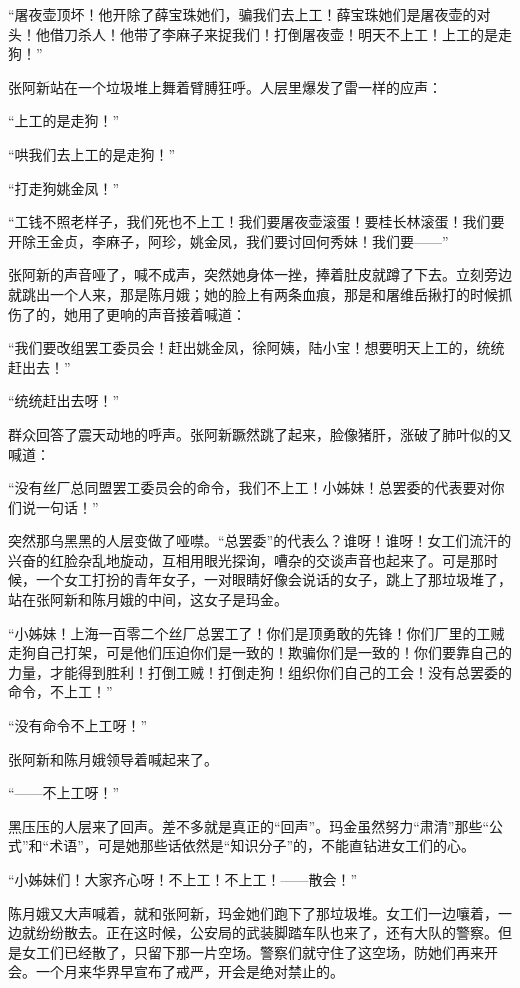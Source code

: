 \par “屠夜壶顶坏！他开除了薛宝珠她们，骗我们去上工！薛宝珠她们是屠夜壶的对头！他借刀杀人！他带了李麻子来捉我们！打倒屠夜壶！明天不上工！上工的是走狗！”
\par 张阿新站在一个垃圾堆上舞着臂膊狂呼。人层里爆发了雷一样的应声：
\par “上工的是走狗！”
\par “哄我们去上工的是走狗！”
\par “打走狗姚金凤！”
\par “工钱不照老样子，我们死也不上工！我们要屠夜壶滚蛋！要桂长林滚蛋！我们要开除王金贞，李麻子，阿珍，姚金凤，我们要讨回何秀妹！我们要——”
\par 张阿新的声音哑了，喊不成声，突然她身体一挫，捧着肚皮就蹲了下去。立刻旁边就跳出一个人来，那是陈月娥；她的脸上有两条血痕，那是和屠维岳揪打的时候抓伤了的，她用了更响的声音接着喊道：
\par “我们要改组罢工委员会！赶出姚金凤，徐阿姨，陆小宝！想要明天上工的，统统赶出去！”
\par “统统赶出去呀！”
\par 群众回答了震天动地的呼声。张阿新蹶然跳了起来，脸像猪肝，涨破了肺叶似的又喊道：
\par “没有丝厂总同盟罢工委员会的命令，我们不上工！小姊妹！总罢委的代表要对你们说一句话！”
\par 突然那乌黑黑的人层变做了哑噤。“总罢委”的代表么？谁呀！谁呀！女工们流汗的兴奋的红脸杂乱地旋动，互相用眼光探询，嘈杂的交谈声音也起来了。可是那时候，一个女工打扮的青年女子，一对眼睛好像会说话的女子，跳上了那垃圾堆了，站在张阿新和陈月娥的中间，这女子是玛金。
\par “小姊妹！上海一百零二个丝厂总罢工了！你们是顶勇敢的先锋！你们厂里的工贼走狗自己打架，可是他们压迫你们是一致的！欺骗你们是一致的！你们要靠自己的力量，才能得到胜利！打倒工贼！打倒走狗！组织你们自己的工会！没有总罢委的命令，不上工！”
\par “没有命令不上工呀！”
\par 张阿新和陈月娥领导着喊起来了。
\par “——不上工呀！”
\par 黑压压的人层来了回声。差不多就是真正的“回声”。玛金虽然努力“肃清”那些“公式”和“术语”，可是她那些话依然是“知识分子”的，不能直钻进女工们的心。
\par “小姊妹们！大家齐心呀！不上工！不上工！——散会！”
\par 陈月娥又大声喊着，就和张阿新，玛金她们跑下了那垃圾堆。女工们一边嚷着，一边就纷纷散去。正在这时候，公安局的武装脚踏车队也来了，还有大队的警察。但是女工们已经散了，只留下那一片空场。警察们就守住了这空场，防她们再来开会。一个月来华界早宣布了戒严，开会是绝对禁止的。
